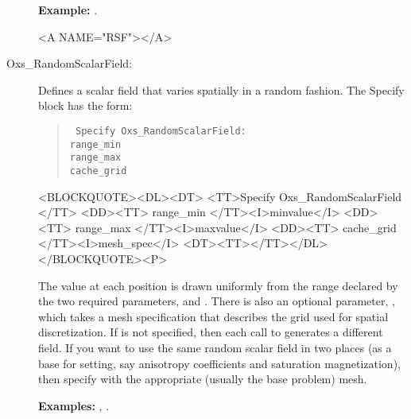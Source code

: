 \begin{description}
\textbf{Example:} .

\begin{rawhtml}<A NAME="RSF"></A>\end{rawhtml}%
%
\item[Oxs\_RandomScalarField:]\label{item:RandomScalarField}
Defines a scalar field that varies spatially in a random fashion.
The Specify block has the form:
      \begin{latexonly}
      \begin{quote}\tt
      Specify Oxs\_RandomScalarField: \ocb\\
       \bi range\_min \\
       \bi range\_max \\
       \bi cache\_grid \\
      \ccb
      \end{quote}
      \end{latexonly}
      \begin{rawhtml}<BLOCKQUOTE><DL><DT>
      <TT>Specify Oxs_RandomScalarField {</TT>
      <DD><TT> range_min </TT><I>minvalue</I>
      <DD><TT> range_max </TT><I>maxvalue</I>
      <DD><TT> cache_grid </TT><I>mesh_spec</I>
      <DT><TT>}</TT></DL></BLOCKQUOTE><P>
      \end{rawhtml}
The value at each position is drawn uniformly from the range declared by
the two required parameters,  and
.  There is also an optional parameter,
, which takes a mesh specification that describes
the grid used for spatial discretization.  If
 is not specified, then each call to
 generates a different field.  If you want to
use the same random scalar field in two places (as a base for setting,
say anisotropy coefficients and saturation magnetization), then specify
 with the appropriate (usually the base problem)
mesh.

\textbf{Examples:} , .


\end{description}
